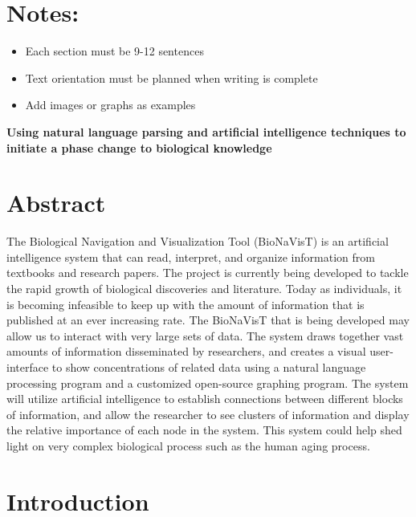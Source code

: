 \documentclass[11pt]{article}
\begin{document}
\section{Notes:}
\begin{itemize}
\item Each section must be 9-12 sentences
\item Text orientation must be planned when writing is complete
\item Add images or graphs as examples
\end{itemize}

\begin{center}
  \vspace{3mm}
         {\bf Using natural language parsing and artificial intelligence techniques to initiate a phase change to biological knowledge}\\
\end{center}

\section{Abstract}

The Biological Navigation and Visualization Tool (BioNaVisT) is an artificial intelligence system that can read, interpret, and organize information from textbooks and research papers. The project is currently being developed to tackle the rapid growth of biological discoveries and literature. Today as individuals, it is becoming infeasible to keep up with the amount of information that is published at an ever increasing rate. The BioNaVisT that is being developed may allow us to interact with very large sets of data. The system draws together vast amounts of information disseminated by researchers, and creates a visual user-interface to show concentrations of related data using a natural language processing program and a customized open-source graphing program. The system will utilize artificial intelligence to establish connections between different blocks of information, and allow the researcher to see clusters of information and display the relative importance of each node in the system. This system could help shed light on very complex biological process such as the human aging process.

\section{Introduction}
\end{document}
